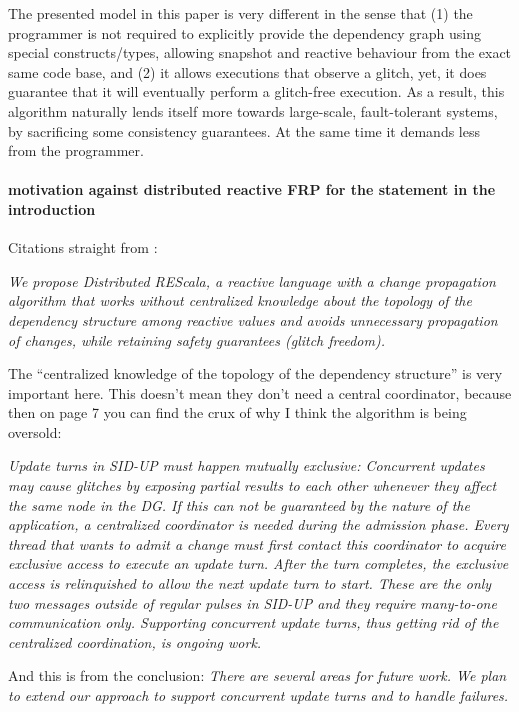 {The presented model in this paper is very different in the sense that (1) the programmer is not required to explicitly provide the dependency graph using special constructs/types, allowing snapshot and reactive behaviour from the exact same code base, and (2) it allows executions that observe a glitch, yet, it does guarantee that it will eventually perform a glitch-free execution. As a result, this algorithm naturally lends itself more towards large-scale, fault-tolerant systems, by sacrificing some consistency guarantees. At the same time it demands less from the programmer. \newline


\paragraph{motivation against distributed reactive FRP for the statement in the introduction}
Citations straight from \cite{drescala}:

\emph{We propose Distributed REScala, a reactive language
with a change propagation algorithm that works without
centralized knowledge about the topology of the dependency
structure among reactive values and avoids unnecessary
propagation of changes, while retaining safety guarantees
(glitch freedom).}

The ``centralized knowledge of the topology of the dependency structure'' is very important here. This doesn't mean they don't need a central coordinator, because then on page 7 you can find the crux of why I think the algorithm is being oversold:

\emph{Update turns in SID-UP must happen mutually exclusive:
Concurrent updates may cause glitches by exposing partial
results to each other whenever they affect the same node in
the DG. If this can not be guaranteed by the nature of the
application, a centralized coordinator is needed during the
admission phase. Every thread that wants to admit a change
must first contact this coordinator to acquire exclusive access
to execute an update turn. After the turn completes, the
exclusive access is relinquished to allow the next update turn
to start. These are the only two messages outside of regular
pulses in SID-UP and they require many-to-one communication
only. Supporting concurrent update turns, thus getting
rid of the centralized coordination, is ongoing work.} \newline

And this is from the conclusion:
\emph{There are several areas for future work. We plan to extend
our approach to support concurrent update turns and to handle
failures.}\newline



}
